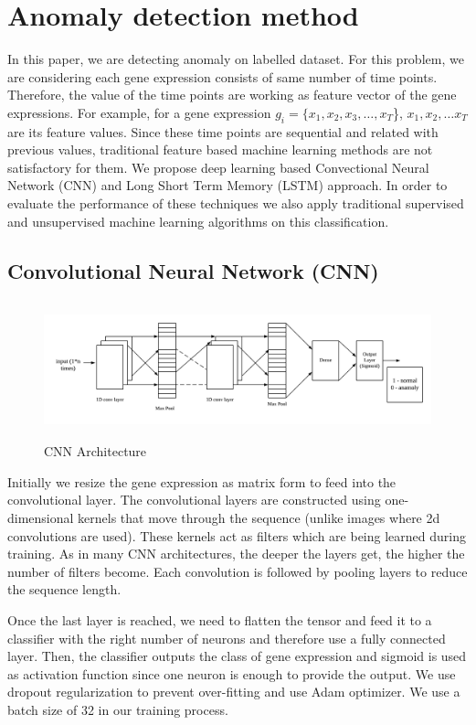 \section{Anomaly detection method}
\label{sec-anom}

In this paper, we are detecting anomaly on labelled dataset. For this problem, we are considering  each gene expression consists of same number of time points. Therefore, the value of the time points are working as feature vector of the gene expressions. For example, for a gene expression $g_i=\{x_1,x_2,x_3,\dots,x_T$\}, $x_1,x_2,\dots x_T$ are its feature values. Since these time points are sequential and related with previous values, traditional feature based machine learning methods are not satisfactory for them. We propose deep learning based Convectional Neural Network (CNN) and Long Short Term Memory (LSTM) approach. In order to evaluate the performance of these techniques we also apply traditional supervised and unsupervised machine learning algorithms on this classification. 

\subsection{Convolutional Neural Network (CNN)}

\begin{figure}
    \centering
    \includegraphics[height=4cm]{Figures/CNN.png}
    \caption{CNN Architecture}
    \label{fig:cnn}
\end{figure}
Initially we resize the gene expression as matrix form to feed into  the convolutional layer. The convolutional layers are constructed using one-dimensional kernels that move through the sequence (unlike images where 2d convolutions are used). These kernels act as filters which are being learned during training. As in many CNN architectures, the deeper the layers get, the higher the number of filters become. Each convolution is followed by pooling layers to reduce the sequence length. 

Once the last layer is reached, we need to flatten the tensor and feed it to a classifier with the right number of neurons and therefore use a fully connected layer. Then, the classifier outputs the class of gene expression and sigmoid is used as activation function since one neuron is enough to provide the output.  We  use dropout regularization to prevent over-fitting and   use  Adam optimizer. We use a batch size of 32 in our training process. 

